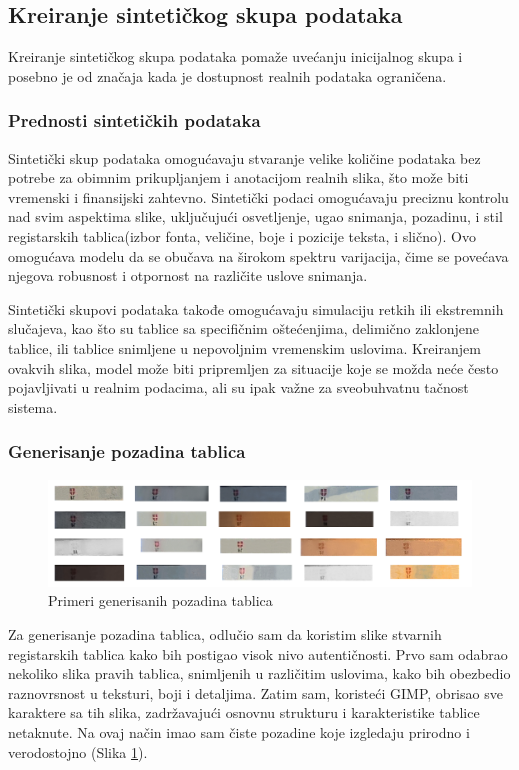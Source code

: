 \documentclass[a4paper,12pt]{article}
\begin{document}
	\subsection{Kreiranje sintetičkog skupa podataka}
	Kreiranje sintetičkog skupa podataka pomaže uvećanju inicijalnog skupa i posebno je od značaja kada je dostupnost realnih podataka ograničena.
	
	\subsubsection{Prednosti sintetičkih podataka}
	Sintetički skup podataka omogućavaju stvaranje velike količine podataka bez potrebe za obimnim prikupljanjem i anotacijom realnih slika, što može biti vremenski i finansijski zahtevno. Sintetički podaci omogućavaju preciznu kontrolu nad svim aspektima slike, uključujući osvetljenje, ugao snimanja, pozadinu, i stil registarskih tablica(izbor fonta, veličine, boje i pozicije teksta, i slično). Ovo omogućava modelu da se obučava na širokom spektru varijacija, čime se povećava njegova robusnost i otpornost na različite uslove snimanja.
	
	Sintetički skupovi podataka takođe omogućavaju simulaciju retkih ili ekstremnih slučajeva, kao što su tablice sa specifičnim oštećenjima, delimično zaklonjene tablice, ili tablice snimljene u nepovoljnim vremenskim uslovima. Kreiranjem ovakvih slika, model može biti pripremljen za situacije koje se možda neće često pojavljivati u realnim podacima, ali su ipak važne za sveobuhvatnu tačnost sistema.
	
	\subsubsection{Generisanje pozadina tablica}
	\begin{figure}[H]
		\centering
		\includegraphics[width=\textwidth]{assets/license-plate-backgrounds.png}
		\caption{Primeri generisanih pozadina tablica}
		\label{fig:license-plate-backgrounds}
	\end{figure}
	
	Za generisanje pozadina tablica, odlučio sam da koristim slike stvarnih registarskih tablica kako bih postigao visok nivo autentičnosti. Prvo sam odabrao nekoliko slika pravih tablica, snimljenih u različitim uslovima, kako bih obezbedio raznovrsnost u teksturi, boji i detaljima. Zatim sam, koristeći GIMP, obrisao sve karaktere sa tih slika, zadržavajući osnovnu strukturu i karakteristike tablice netaknute. Na ovaj način imao sam čiste pozadine koje izgledaju prirodno i verodostojno (Slika \ref{fig:license-plate-backgrounds}).
	
\end{document}
